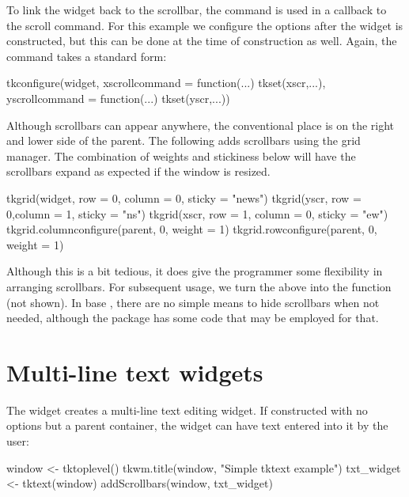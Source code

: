 To link the widget back to the scrollbar, the  command is
used in a callback to the scroll command.  For this example we
configure the options after the widget is constructed, but this can be
done at the time of construction as well. Again, the command takes a
standard form:
\begin{Schunk}
\begin{Sinput}
 tkconfigure(widget,
             xscrollcommand = function(...) tkset(xscr,...),
             yscrollcommand = function(...) tkset(yscr,...))
\end{Sinput}
\end{Schunk}

Although scrollbars can appear anywhere, the conventional place is on
the right and lower side of the parent. The following adds scrollbars
using the grid manager. The combination of weights and stickiness below
will have the scrollbars expand as expected if the window is resized.
\begin{Schunk}
\begin{Sinput}
 tkgrid(widget, row = 0, column = 0, sticky = "news")
 tkgrid(yscr, row = 0,column = 1, sticky = "ns")
 tkgrid(xscr, row = 1, column = 0, sticky = "ew")
 tkgrid.columnconfigure(parent, 0, weight = 1)
 tkgrid.rowconfigure(parent, 0, weight = 1)
\end{Sinput}
\end{Schunk}
%
Although this is a bit tedious, it does give the programmer some
flexibility in arranging scrollbars. For subsequent usage, we turn the above into the
function  (not shown). In
base \Tk, there are no simple means to hide scrollbars when not
needed, although the  package has some code that may be
employed for that.


\section{Multi-line text widgets}
\label{sec:tcltk:multi-line-text}

The  widget creates a multi-line text editing
widget. If constructed with no options but a parent container, the
widget can have text entered into it by the user:

\begin{Schunk}
\begin{Sinput}
 window <- tktoplevel()
 tkwm.title(window, "Simple tktext example")
 txt_widget <- tktext(window)
 addScrollbars(window, txt_widget)
\end{Sinput}
\end{Schunk}
%

